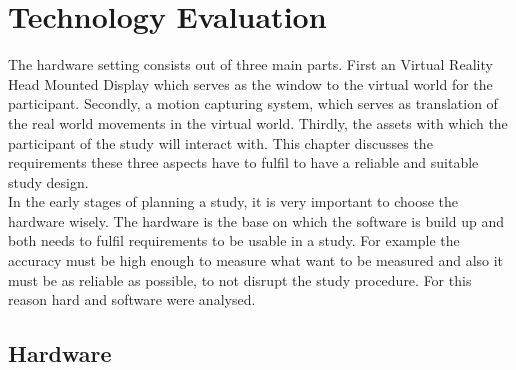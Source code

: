 \chapter{Technology Evaluation}
The hardware setting consists out of three main parts. First an Virtual Reality Head Mounted Display which serves as the window to the virtual world for the participant. Secondly, a motion capturing system, which serves as translation of the real world movements in the virtual world. Thirdly, the assets with which the participant of the study will interact with. This chapter discusses the requirements these three aspects have to fulfil to have a reliable and suitable study design.\\ 
In the early stages of planning a study, it is very important to choose the hardware wisely. The hardware is the base on which the software is build up and both needs to fulfil requirements to be usable in a study. For example the accuracy must be high enough to measure what want to be measured and also it must be as reliable as possible, to not disrupt the study procedure. For this reason hard and software were analysed.
\section{Hardware}
